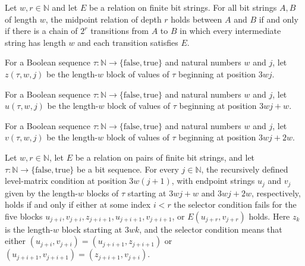 \begin{theorem}
\label{Complexity.TQBFHard.mid_iff_steps}
\leanok
{}
Let $w,r\in\mathbb{N}$ and let $E$ be a relation on finite bit strings. For all bit
strings $A,B$ of length $w$, the midpoint relation of depth $r$ holds between $A$ and
$B$ if and only if there is a chain of $2^r$ transitions from $A$ to $B$ in which every
intermediate string has length $w$ and each transition satisfies $E$.
\end{theorem}

\begin{definition}
\label{Complexity.TQBFHard.zRec}
\leanok
{}
For a Boolean sequence $\tau : \mathbb{N} \to \{\mathrm{false},\mathrm{true}\}$ and
natural numbers $w$ and $j$, let $z(\tau,w,j)$ be the length-$w$ block of values of
$\tau$ beginning at position $3wj$.
\end{definition}

\begin{definition}
\label{Complexity.TQBFHard.uRec}
\leanok
{}
For a Boolean sequence $\tau : \mathbb{N} \to \{\mathrm{false},\mathrm{true}\}$ and
natural numbers $w$ and $j$, let $u(\tau,w,j)$ be the length-$w$ block of values of
$\tau$ beginning at position $3wj+w$.
\end{definition}

\begin{definition}
\label{Complexity.TQBFHard.vRec}
\leanok
{}
For a Boolean sequence $\tau : \mathbb{N} \to \{\mathrm{false},\mathrm{true}\}$ and
natural numbers $w$ and $j$, let $v(\tau,w,j)$ be the length-$w$ block of values of
$\tau$ beginning at position $3wj+2w$.
\end{definition}

\begin{theorem}
\label{Complexity.TQBFHard.levelMatrix_iff_flat}
\leanok
{}
Let $w,r\in\mathbb{N}$, let $E$ be a relation on pairs of finite bit strings, and let
$\tau:\mathbb{N}\to\{\mathrm{false},\mathrm{true}\}$ be a bit sequence. For every
$j\in\mathbb{N}$, the recursively defined level-matrix condition at position $3w(j+1)$,
with endpoint strings $u_j$ and $v_j$ given by the length-$w$ blocks of $\tau$ starting
at $3wj+w$ and $3wj+2w$, respectively, holds if and only if either at some index $i<r$
the selector condition fails for the five blocks
$u_{j+i},v_{j+i},z_{j+i+1},u_{j+i+1},v_{j+i+1}$, or $E(u_{j+r},v_{j+r})$ holds. Here
$z_k$ is the length-$w$ block starting at $3wk$, and the selector condition means that
either $(u_{j+i},v_{j+i})=(u_{j+i+1},z_{j+i+1})$ or
$(u_{j+i+1},v_{j+i+1})=(z_{j+i+1},v_{j+i})$.
\end{theorem}
